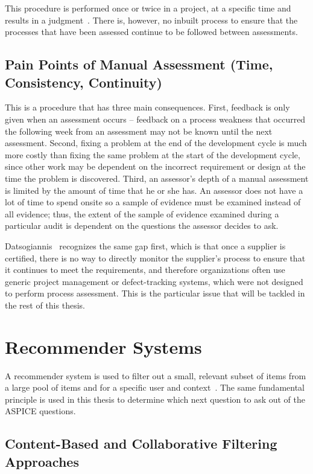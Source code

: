 \documentclass[a4paper, 12pt, oneside, openany, BCOR1cm,toc=chapterentrywithdots]{scrbook}
\begin{document}
This procedure is performed once or twice in a project, at a specific time and results in a
judgment~\cite{vdaqmc2023pam,murphy_aspice_0to60}. There is, however, no inbuilt process to
ensure that the processes that have been assessed continue to be followed between assessments.

\subsection{Pain Points of Manual Assessment (Time, Consistency, Continuity)}

This is a procedure that has three main consequences. First, feedback is only given when an
assessment occurs -- feedback on a process weakness that occurred the following week from an
assessment may not be known until the next assessment. Second, fixing a problem at the end of the
development cycle is much more costly than fixing the same problem at the start of the
development cycle, since other work may be dependent on the incorrect requirement or design at
the time the problem is discovered. Third, an assessor's depth of a manual assessment is limited
by the amount of time that he or she has. An assessor does not have a lot of time to spend onsite
so a sample of evidence must be examined instead of all evidence; thus, the extent of the sample
of evidence examined during a particular audit is dependent on the questions the assessor decides
to ask.

Datsogiannis~\cite{datsogiannis2024early} recognizes the same gap first, which is that once a
supplier is certified, there is no way to directly monitor the supplier's process to ensure that
it continues to meet the requirements, and therefore organizations often use generic project
management or defect-tracking systems, which were not designed to perform process assessment.
This is the particular issue that will be tackled in the rest of this thesis.

\section{Recommender Systems}

A recommender system is used to filter out a small, relevant subset of items from a large pool of
items and for a specific user and context~\cite{lu2012recommendersystems}. The same fundamental
principle is used in this thesis to determine which next question to ask out of the ASPICE
questions.

\subsection{Content-Based and Collaborative Filtering Approaches}
\end{document}
